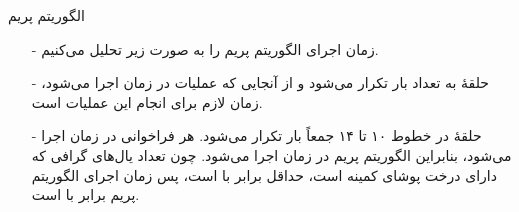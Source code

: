 \begin{frame}{‌الگوریتم پریم}
\begin{itemize}\itemr
\item[-]
زمان اجرای الگوریتم پریم را به صورت زیر تحلیل می‌کنیم.
\item[-]
حلقهٔ
به تعداد
بار تکرار می‌شود و از آنجایی که عملیات
در زمان
اجرا می‌شود، زمان لازم برای انجام این عملیات
است.
\item[-]
حلقهٔ
در خطوط ۱۰ تا ۱۴ جمعاً
بار تکرار می‌شود. هر فراخوانی
در زمان
اجرا می‌شود، بنابراین الگوریتم پریم در زمان
اجرا می‌شود. چون تعداد یال‌های گرافی که دارای درخت پوشای کمینه است، حداقل برابر با 
است، پس زمان اجرای الگوریتم پریم برابر با
 است.
\end{itemize}
\end{frame}

